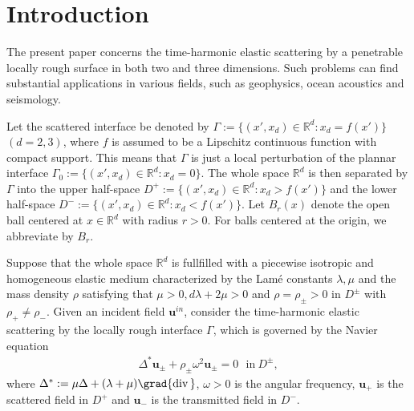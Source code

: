 \documentclass[final,reqno]{siamltex}
\newcommand{\om}{\omega}
\newcommand{\dive}{{\rm div\,}}
\newcommand{\mat}{\mathbb}
\newcommand{\R}{{\mat R}}
\begin{document}
\section{Introduction}\label{sec1}
\setcounter{equation}{0}
The present paper concerns the time-harmonic elastic scattering by a penetrable locally rough surface in both two and three dimensions. Such problems can find substantial applications in various fields, such as geophysics, ocean acoustics and seismology. 

Let the scattered interface be denoted by $\Gamma:=\{(x',x_d)\in \R^d:x_d=f(x')\}$ $(d=2,3)$, where $f$ is assumed to be a Lipschitz continuous function with compact support. This means that $\Gamma$ is just a local perturbation of the plannar interface $\Gamma_0:=\{(x',x_d)\in \R^d:x_d=0\}$. The whole space $\R^d$ is then separated by $\Gamma$ into the upper half-space $D^+:=\{(x',x_d)\in \R^d:x_d>f(x')\}$ and the lower half-space $D^-:=\{(x',x_d)\in \R^d:x_d<f(x')\}$. Let $B_r(x)$ denote the open ball centered at $x\in\R^d$ with radius $r>0$. For balls centered at the origin, we abbreviate by $B_r$. 

Suppose that the whole space $\R^d$ is fullfilled with a piecewise isotropic and homogeneous elastic medium characterized by the Lamé constants $\lambda,\mu$ and the mass density $\rho$ satisfying that $\mu>0,d\lambda+2\mu>0$ and $\rho=\rho_\pm>0$ in $D^\pm$ with $\rho_+\neq\rho_-$. Given an incident field $\mathbf{u}^{in}$, consider the time-harmonic elastic scattering by the locally rough interface $\Gamma$, which is governed by the Navier equation 
\begin{align}\label{1.1}
  \Delta^*\mathbf{u}_\pm+\rho_\pm\om^2\mathbf{u}_\pm=0~~~\text{in}~D^\pm, 
\end{align}
where $\Delta^*:=\mu\Delta+(\lambda+\mu)\grad\dive$, $\om>0$ is the angular frequency, $\mathbf{u}_+$ is the scattered field in $D^+$ and $\mathbf{u}_-$ is the transmitted field in $D^-$. 
\end{document}

